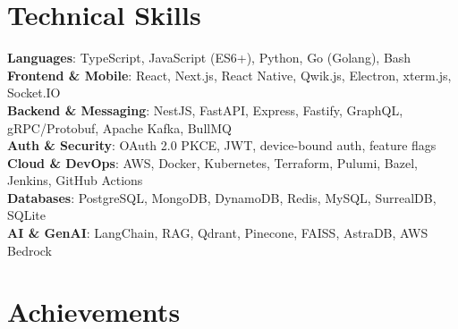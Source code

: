 \documentclass[letterpaper,10pt]{article}
\begin{document}
\section{Technical Skills}
 \begin{itemize}[leftmargin=0.15in, label={}]
    \small{\item{
     \textbf{Languages}{: TypeScript, JavaScript (ES6+), Python, Go (Golang), Bash} \\
     \textbf{Frontend \& Mobile}{: React, Next.js, React Native, Qwik.js, Electron, xterm.js, Socket.IO} \\
     \textbf{Backend \& Messaging}{: NestJS, FastAPI, Express, Fastify, GraphQL, gRPC/Protobuf, Apache Kafka, BullMQ} \\
     \textbf{Auth \& Security}{: OAuth 2.0 PKCE, JWT, device-bound auth, feature flags} \\
     \textbf{Cloud \& DevOps}{: AWS, Docker, Kubernetes, Terraform, Pulumi, Bazel, Jenkins, GitHub Actions} \\
     \textbf{Databases}{: PostgreSQL, MongoDB, DynamoDB, Redis, MySQL, SurrealDB, SQLite} \\
     \textbf{AI \& GenAI}{: LangChain, RAG, Qdrant, Pinecone, FAISS, AstraDB, AWS Bedrock}
    }}
 \end{itemize}

\section{Achievements}
\begin{itemize}[leftmargin=0.15in]
\end{itemize}
\end{document}
